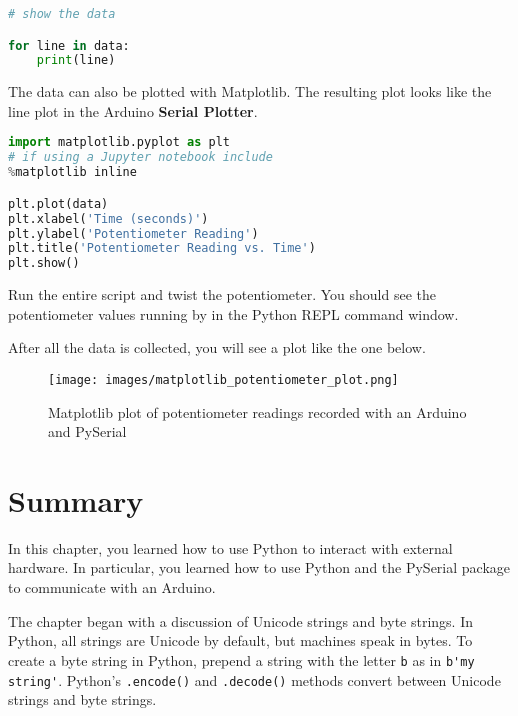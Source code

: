 \documentclass{book}
\makeatletter
\def\maxwidth{\ifdim\Gin@nat@width>\linewidth\linewidth
\else\Gin@nat@width\fi}
\let\Oldincludegraphics\includegraphics
\renewcommand{\includegraphics}[1]{\Oldincludegraphics[width=.8\maxwidth]{#1}}
\newcommand{\passthrough}[1]{#1}
\makeatother
\begin{document}
    
        \begin{lstlisting}[language=Python]
# show the data

for line in data:
    print(line)
\end{lstlisting}
    




    
        The data can also be plotted with Matplotlib. The resulting plot looks
like the line plot in the Arduino \textbf{Serial Plotter}.
    




    
        \begin{lstlisting}[language=Python]
import matplotlib.pyplot as plt
# if using a Jupyter notebook include
%matplotlib inline

plt.plot(data)
plt.xlabel('Time (seconds)')
plt.ylabel('Potentiometer Reading')
plt.title('Potentiometer Reading vs. Time')
plt.show()
\end{lstlisting}
    




    
        Run the entire script and twist the potentiometer. You should see the
potentiometer values running by in the Python REPL command window.

After all the data is collected, you will see a plot like the one below.

\begin{figure}
\centering
\texttt{[image: images/matplotlib\_potentiometer\_plot.png]}
\caption{Matplotlib plot of potentiometer readings recorded with an
Arduino and PySerial}
\end{figure}
    




    
        \newpage
        \hypertarget{summary}{%
\section{Summary}\label{summary}}

    




    
        In this chapter, you learned how to use Python to interact with external
hardware. In particular, you learned how to use Python and the PySerial
package to communicate with an Arduino.

The chapter began with a discussion of Unicode strings and byte strings.
In Python, all strings are Unicode by default, but machines speak in
bytes. To create a byte string in Python, prepend a string with the
letter \passthrough{\lstinline!b!} as in
\passthrough{\lstinline!b'my string'!}. Python's
\passthrough{\lstinline!.encode()!} and
\passthrough{\lstinline!.decode()!} methods convert between Unicode
strings and byte strings.
\end{document}
